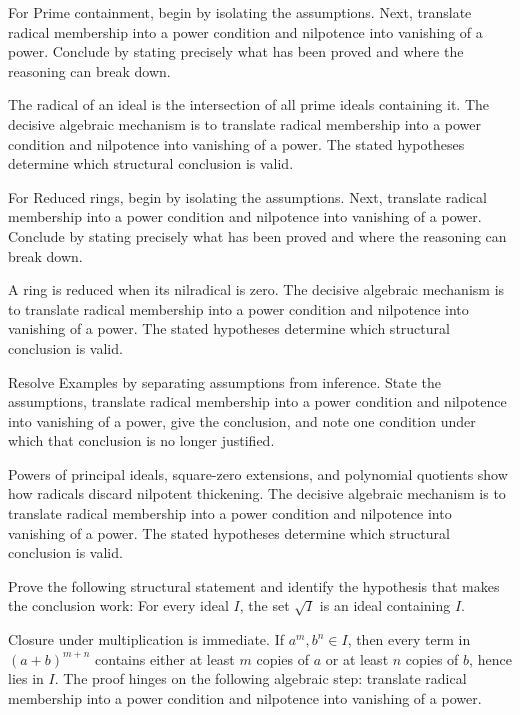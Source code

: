 \begin{problem}\label{prob:v03-problem-06}
For Prime containment, begin by isolating the assumptions. Next, translate radical membership into a power condition and nilpotence into vanishing of a power. Conclude by stating precisely what has been proved and where the reasoning can break down.
\end{problem}
\begin{solution}
The radical of an ideal is the intersection of all prime ideals containing it. The decisive algebraic mechanism is to translate radical membership into a power condition and nilpotence into vanishing of a power. The stated hypotheses determine which structural conclusion is valid.
\end{solution}

\begin{problem}\label{prob:v03-problem-07}
For Reduced rings, begin by isolating the assumptions. Next, translate radical membership into a power condition and nilpotence into vanishing of a power. Conclude by stating precisely what has been proved and where the reasoning can break down.
\end{problem}
\begin{solution}
A ring is reduced when its nilradical is zero. The decisive algebraic mechanism is to translate radical membership into a power condition and nilpotence into vanishing of a power. The stated hypotheses determine which structural conclusion is valid.
\end{solution}

\begin{problem}\label{prob:v03-problem-08}
Resolve Examples by separating assumptions from inference. State the assumptions, translate radical membership into a power condition and nilpotence into vanishing of a power, give the conclusion, and note one condition under which that conclusion is no longer justified.
\end{problem}
\begin{solution}
Powers of principal ideals, square-zero extensions, and polynomial quotients show how radicals discard nilpotent thickening. The decisive algebraic mechanism is to translate radical membership into a power condition and nilpotence into vanishing of a power. The stated hypotheses determine which structural conclusion is valid.
\end{solution}

\begin{problem}\label{prob:v03-problem-09}
Prove the following structural statement and identify the hypothesis that makes the conclusion work: For every ideal $I$, the set $\sqrt I$ is an ideal containing $I$.
\end{problem}
\begin{solution}
Closure under multiplication is immediate. If $a^m,b^n\in I$, then every term in $(a+b)^{m+n}$ contains either at least $m$ copies of $a$ or at least $n$ copies of $b$, hence lies in $I$. The proof hinges on the following algebraic step: translate radical membership into a power condition and nilpotence into vanishing of a power.
\end{solution}

